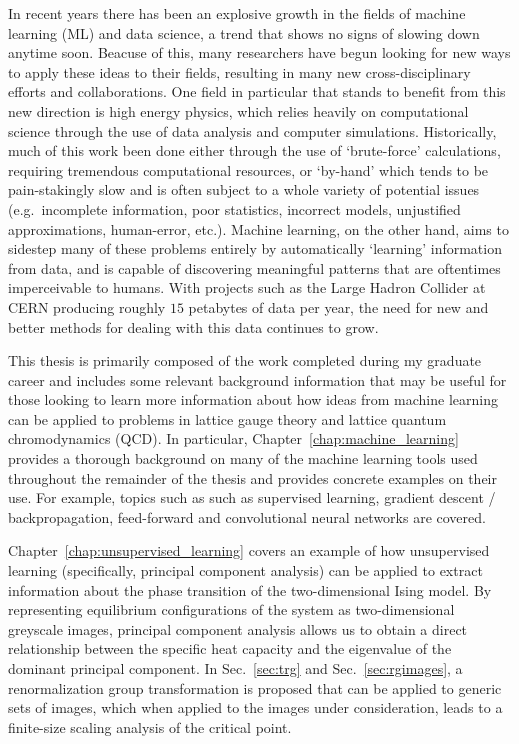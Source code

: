 \documentclass[../main.tex]{subfiles}
\begin{document}
In recent years there has been an explosive growth in the fields of machine learning (ML) and data science, a trend
that shows no signs of slowing down anytime soon.
%
Beacuse of this, many researchers have begun looking for new ways to apply these ideas to their fields, resulting in
many new cross-disciplinary efforts and collaborations.
%
One field in particular that stands to benefit from this new direction is high energy physics, which relies
heavily on computational science through the use of data analysis and computer simulations.
%
Historically, much of this work been done either through the use of `brute-force' calculations, requiring tremendous
computational resources, or `by-hand' which tends to be pain-stakingly slow and is often subject to a whole variety
of potential issues (e.g.\ incomplete information, poor statistics, incorrect models, unjustified approximations,
human-error, etc.).
%
%
Machine learning, on the other hand, aims to sidestep many of these problems entirely by automatically `learning'
information from data, and is capable of discovering meaningful patterns that are oftentimes imperceivable to humans.
%
With projects such as the Large Hadron Collider at CERN producing roughly $15$ petabytes of data per year, the need for
new and better methods for dealing with this data continues to grow.
  
This thesis is primarily composed of the work completed during my graduate career and includes some relevant background
information that may be useful for those looking to learn more information about how ideas from machine learning can be
applied to problems in lattice gauge theory and lattice quantum chromodynamics (QCD).
%
In particular, Chapter~\ref{chap:machine_learning} provides a thorough background on many of the machine learning tools
used throughout the remainder of the thesis and provides concrete examples on their use.
%
For example, topics such as such as supervised learning, gradient descent / backpropagation, feed-forward and
convolutional neural networks are covered.

Chapter~\ref{chap:unsupervised_learning} covers an example of how unsupervised learning (specifically, principal
component analysis) can be applied to extract information about the phase transition of the two-dimensional Ising
model.
%
By representing equilibrium configurations of the system as two-dimensional greyscale images, principal component
analysis allows us to obtain a direct relationship between the specific heat capacity and the eigenvalue of the
dominant principal component.
%
In Sec.~\ref{sec:trg} and Sec.~\ref{sec:rgimages}, a renormalization group transformation is proposed that can be
applied to generic sets of images, which when applied to the images under consideration, leads to a finite-size scaling
analysis of the critical point.
\end{document}
